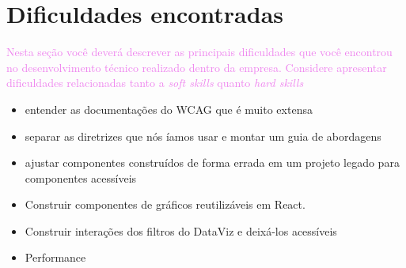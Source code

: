 \section{Dificuldades encontradas}
\label{sec:dificuldades}

\textcolor{violet}{Nesta seção você deverá descrever as principais dificuldades que você encontrou no desenvolvimento técnico realizado dentro da empresa. Considere apresentar dificuldades relacionadas tanto a \textit{soft skills} quanto \textit{hard skills}}
{
\begin{itemize}
    \item entender as documentações do WCAG que é muito extensa
    \item separar as diretrizes que nós íamos usar e montar um guia de abordagens
    \item ajustar componentes construídos de forma errada em um projeto legado para componentes acessíveis
    \item Construir componentes de gráficos reutilizáveis em React.
    \item Construir interações dos filtros do DataViz e deixá-los acessíveis
    \item Performance
\end{itemize}}
